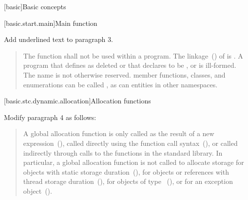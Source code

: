
\setcounter{chapter}{2}
[basic]{Basic concepts}

\setcounter{section}{6}

[basic.start.main]{Main function}

Add underlined text to paragraph 3.

\begin{quote}
	\setcounter{Paras}{2}

\pnum
The function  shall not be used within
a program.
%
The linkage~() of  is
. A program that defines  as
deleted or that declares  to be
 , or  is ill-formed. 
The name  is
not otherwise reserved. \enterexample member functions, classes, and
enumerations can be called , as can entities in other
namespaces. \exitexample
\end{quote}

\setcounter{section}{7}
\setcounter{subsection}{4}
[basic.stc.dynamic.allocation]{Allocation functions}

Modify paragraph 4 as follows:

\begin{quote}
	\setcounter{Paras}{3}
\pnum
\cbstart
A global allocation function is only called as the result of a new
expression~(),  called directly using the function call
syntax~(), 
 \cbend
or called indirectly through calls to the
functions in the \Cpp standard library. \enternote In particular, a
global allocation function is not called to allocate storage for objects
with static storage duration~(), for objects or references
with thread storage duration~(), for objects of
type ~(), or for an
exception object~().
\exitnote
\end{quote}

